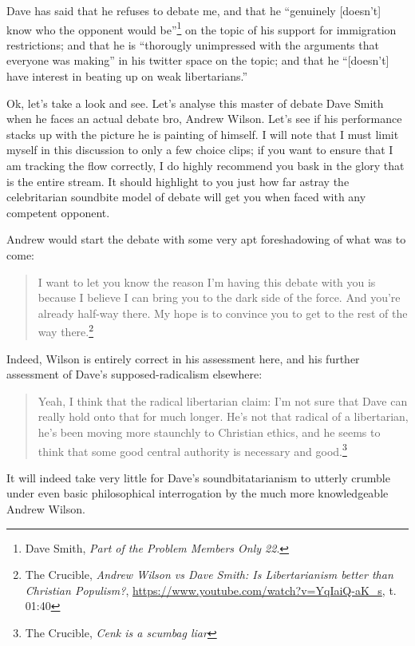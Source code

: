 \documentclass[11pt]{article}
\begin{document}
Dave has said that he refuses to debate me, and that he ``genuinely [doesn't] know who the opponent would be''\footnote{Dave Smith, \emph{Part of the Problem Members Only 22}.} on the topic of his support for immigration restrictions; and that he is ``thorougly unimpressed with the arguments that everyone was making'' in his twitter space on the topic; and that he ``[doesn't] have interest in beating up on weak libertarians.''

Ok, let's take a look and see. Let's analyse this master of debate Dave Smith when he faces an actual debate bro, Andrew Wilson. Let's see if his performance stacks up with the picture he is painting of himself. I will note that I must limit myself in this discussion to only a few choice clips; if you want to ensure that I am tracking the flow correctly, I do highly recommend you bask in the glory that is the entire stream. It should highlight to you just how far astray the celebritarian soundbite model of debate will get you when faced with any competent opponent.

Andrew would start the debate with some very apt foreshadowing of what was to come:
\begin{quote}
I want to let you know the reason I'm having this debate with you is because I believe I can bring you to the dark side of the force. And you're already half-way there. My hope is to convince you to get to the rest of the way there.\footnote{The Crucible, \emph{Andrew Wilson vs Dave Smith: Is Libertarianism better than Christian Populism?}, \url{https://www.youtube.com/watch?v=YqIaiQ-aK\_s}, t. 01:40}
\end{quote}

Indeed, Wilson is entirely correct in his assessment here, and his further assessment of Dave's supposed-radicalism elsewhere:
\begin{quote}
Yeah, I think that the radical libertarian claim: I'm not sure that Dave can really hold onto that for much longer. He's not that radical of a libertarian, he's been moving more staunchly to Christian ethics, and he seems to think that some good central authority is necessary and good.\footnote{The Crucible, \emph{Cenk is a scumbag liar}}
\end{quote}

It will indeed take very little for Dave's soundbitatarianism to utterly crumble under even basic philosophical interrogation by the much more knowledgeable Andrew Wilson.
\end{document}
